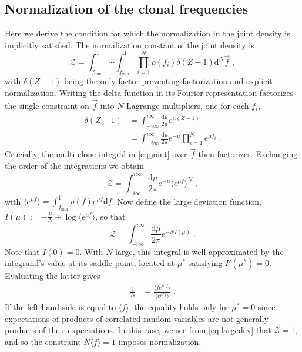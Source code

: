\documentclass[pre,twocolumn,english,longbibliography]{revtex4}
\newcommand{\<}{\langle}
\renewcommand{\>}{\rangle}
\begin{document}
\subsection*{Normalization of the clonal frequencies}\label{sec:normal}
Here we derive the condition for which the normalization in the joint density is implicitly satisfied. The normalization constant of the joint density is
\begin{equation}
	\mathcal{Z}=\int_{f_\textrm{min}}^1\cdots\int_{f_\textrm{min}}^1\prod_{i=1}^N \rho(f_i)\delta(Z-1)\textrm{d}^N\vec{f} \;\label{eq:joint},
\end{equation}
with $\delta(Z-1)$ being the only factor preventing factorization and explicit normalization. Writing the delta function in its Fourier representation factorizes the single constraint on $\vec{f}$ into $N$ Lagrange multipliers, one for each $f_i$,
\begin{align}
	\delta(Z-1)&=\int_{-i\infty}^{i\infty} \frac{\textrm{d} \mu}{2 \pi}e^{\mu(Z-1)}  \\
	&=\int_{-i\infty}^{i\infty} \frac{\textrm{d} \mu}{2 \pi}e^{-\mu}\prod_{i=1}^N e^{\mu f_i} \;.
\end{align}
Crucially, the multi-clone integral in \cref{eq:joint} over $\vec{f}$ then factorizes. Exchanging the order of the integrations we obtain
\begin{equation}
	\mathcal{Z}=\int_{-i\infty}^{i\infty} \frac{\textrm{d} \mu}{2 \pi} e^{-\mu} \langle e^{\mu f}\rangle^N\;,\label{eq:bigZ}
\end{equation}
with $\langle e^{\mu f}\rangle=\int_{f_\textrm{min}}^1\rho(f)e^{\mu f}\textrm{d}f$. Now define the large deviation function, $I(\mu):=-\frac{\mu}{N}+\log \langle e^{\mu f}\rangle$, so that 
\begin{equation}
	\mathcal{Z}=\int_{-i\infty}^{i\infty} \frac{\textrm{d} \mu}{2 \pi} e^{-N I(\mu)}\;.\label{eq:largedev}
\end{equation}
Note that $I(0)=0$. With $N$ large, this integral is well-approximated by the integrand's value at its saddle point, located at $\mu^*$ satisfying $I'(\mu^*)=0$.  Evaluating the latter gives
\begin{align}
	\frac{1}{N}&=\frac{\langle f e^{\mu^* f}\rangle}{\langle e^{\mu^* f}\rangle}\;.
\end{align} 
If the left-hand side is equal to $\langle f\rangle$, the equality holds only for $\mu^*=0$ since expectations of products of correlated random variables are not generally products of their expectations. 
In this case, we see from \cref{eq:largedev} that $\mathcal{Z}=1$, and so the constraint $N\langle f\rangle=1$ imposes normalization.
\end{document}
